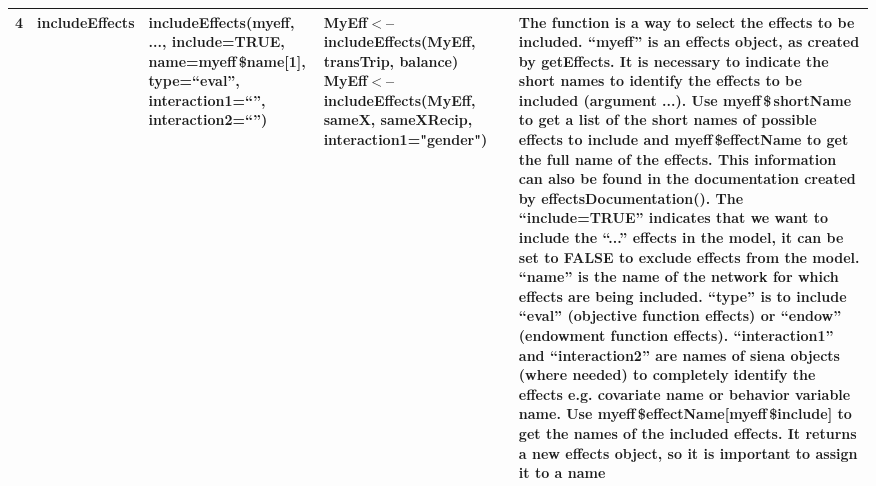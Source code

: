\documentclass[a4paper,fleqn]{article}
\newcommand{\+}{\, + \,}
\begin{document}
{\begin{landscape}
\begin{longtable}{c | p{3cm} | p{5.2cm} | p{4.2cm} | p{8.5cm} }
4 & includeEffects & includeEffects(myeff, ..., include=TRUE, \newline
name=myeff{\,\$}name[1], type=``eval'', \newline
interaction1=``'',\newline
interaction2=``'') & {MyEff$<$--includeEffects(MyEff, transTrip, balance)
\flushleft MyEff$<$--includeEffects(MyEff, sameX, \newline
sameXRecip, \newline
interaction1="gender")}
 &The function is a
way to select the effects to be included. ``myeff'' is an effects object, as
created by getEffects. It is necessary to indicate the short names to identify
the effects to be included (argument ...). Use myeff{\,\$\,}shortName to get a list
of the short names of possible effects to include and myeff{\,\$}effectName to get
the full name of the effects. This information can also be found in the
documentation created by effectsDocumentation(). The ``include=TRUE'' indicates
that we want to include the ``...'' effects in the model, it can be set to
FALSE to exclude effects from the model. ``name'' is the name of the network
for which effects are being included. ``type'' is to include ``eval''
(objective function effects) or ``endow'' (endowment function effects).
``interaction1'' and ``interaction2'' are names of siena objects (where needed)
to completely identify the effects e.g. covariate name or behavior variable
name. Use myeff{\,\$}effectName[myeff{\,\$}include] to get the names of the included
effects. It returns a new effects object, so it is important to assign it to a
name\\
\hline


\end{longtable}
\end{landscape}}
\end{document}
